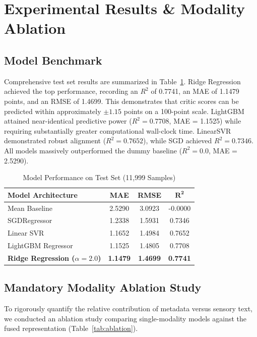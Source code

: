 \documentclass[conference]{IEEEtran}
\begin{document}
\section{Experimental Results \& Modality Ablation}
\subsection{Model Benchmark}
Comprehensive test set results are summarized in Table~\ref{tab:models}. Ridge Regression achieved the top performance, recording an $R^2$ of 0.7741, an MAE of 1.1479 points, and an RMSE of 1.4699. This demonstrates that critic scores can be predicted within approximately $\pm 1.15$ points on a 100-point scale. LightGBM attained near-identical predictive power ($R^2 = 0.7708$, MAE = 1.1525) while requiring substantially greater computational wall-clock time. LinearSVR demonstrated robust alignment ($R^2 = 0.7652$), while SGD achieved $R^2 = 0.7346$. All models massively outperformed the dummy baseline ($R^2 = 0.0$, MAE = 2.5290).

\begin{table}[htbp]
\caption{Model Performance on Test Set (11,999 Samples)}
\label{tab:models}
\centering
\begin{tabular}{lccc}
\toprule
\textbf{Model Architecture} & \textbf{MAE} & \textbf{RMSE} & $\mathbf{R^2}$ \\
\midrule
Mean Baseline & 2.5290 & 3.0923 & -0.0000 \\
SGDRegressor & 1.2338 & 1.5931 & 0.7346 \\
Linear SVR & 1.1652 & 1.4984 & 0.7652 \\
LightGBM Regressor & 1.1525 & 1.4805 & 0.7708 \\
\textbf{Ridge Regression ($\alpha=2.0$)} & \textbf{1.1479} & \textbf{1.4699} & \textbf{0.7741} \\
\bottomrule
\end{tabular}
\end{table}

\subsection{Mandatory Modality Ablation Study}
To rigorously quantify the relative contribution of metadata versus sensory text, we conducted an ablation study comparing single-modality models against the fused representation (Table~\ref{tab:ablation}).
\end{document}
